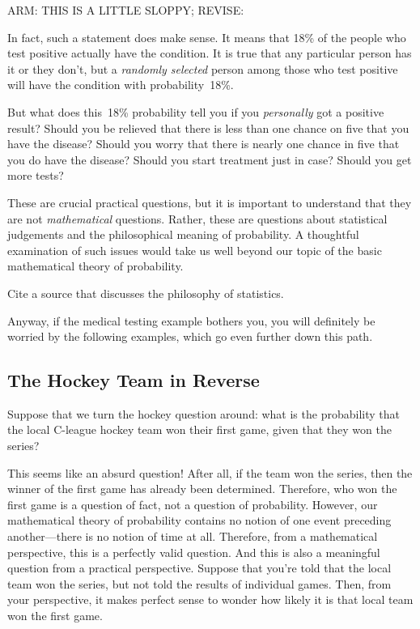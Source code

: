 \begin{editingnotes}
ARM: THIS IS A LITTLE SLOPPY; REVISE:
\end{editingnotes}

In fact, such a statement does make sense.  It means that 18\% of the
people who test positive actually have the condition.  It is true that
any particular person has it or they don't, but a \emph{randomly
  selected} person among those who test positive will have the
condition with probability~18\%.

But what does this~18\% probability tell you if you \emph{personally}
got a positive result?  Should you be relieved that there is less than
one chance on five that you have the disease?  Should you worry that
there is nearly one chance in five that you do have the disease?
Should you start treatment just in case?  Should you get more tests?

These are crucial practical questions, but it is important to
understand that they are not \emph{mathematical} questions.  Rather,
these are questions about statistical judgements and the philosophical
meaning of probability.  A thoughtful examination of such issues would
take us well beyond our topic of the basic mathematical theory of
probability.

\begin{editingnotes}
Cite a source that discusses the philosophy of statistics.
\end{editingnotes}

Anyway, if the medical testing example bothers you, you will
definitely be worried by the following examples, which go even further
down this path.

\subsection{The Hockey Team in Reverse}

Suppose that we turn the hockey question around: what is the
probability that the local C-league hockey team won their first game,
given that they won the series?

This seems like an absurd question!  After all, if the team won the
series, then the winner of the first game has already been determined.
Therefore, who won the first game is a question of fact, not a
question of probability.  However, our mathematical theory of
probability contains no notion of one event preceding another---there
is no notion of time at all.  Therefore, from a mathematical
perspective, this is a perfectly valid question.  And this is also a
meaningful question from a practical perspective.  Suppose that you're
told that the local team won the series, but not told the results
of individual games.  Then, from your perspective, it makes perfect
sense to wonder how likely it is that local team won the first game.

